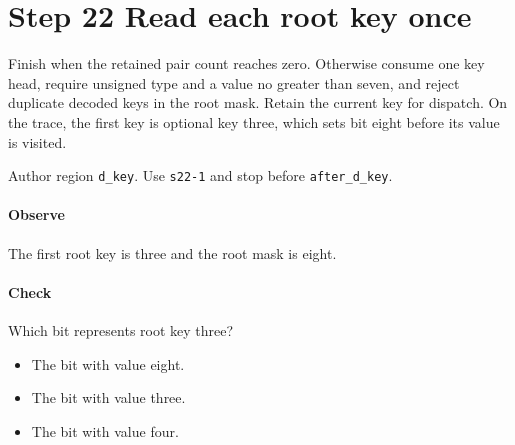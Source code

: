 \section{Step 22 Read each root key once}\label{cbor-s22}
Finish when the retained pair count reaches zero. Otherwise consume one key head, require unsigned type and a value no greater than seven, and reject duplicate decoded keys in the root mask. Retain the current key for dispatch. On the trace, the first key is optional key three, which sets bit eight before its value is visited.

Author region \texttt{d\_key}. Use \texttt{s22-1} and stop before \texttt{after\_d\_key}.

\paragraph{Observe} The first root key is three and the root mask is eight.

\paragraph{Check} Which bit represents root key three?
\begin{itemize}
  \item[A.] The bit with value eight.
  \item[B.] The bit with value three.
  \item[C.] The bit with value four.
\end{itemize}
